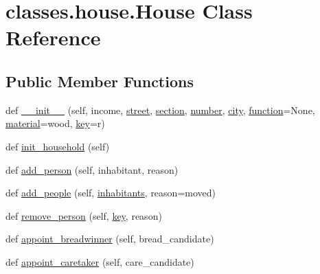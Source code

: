 \hypertarget{classclasses_1_1house_1_1House}{}\section{classes.\+house.\+House Class Reference}
\label{classclasses_1_1house_1_1House}
\subsection*{Public Member Functions}
\begin{DoxyCompactItemize}
\item 
def \hyperlink{classclasses_1_1house_1_1House_aff02285c20463b96120bd06ad62bf850}{\+\_\+\+\_\+init\+\_\+\+\_\+} (self, income, \hyperlink{classclasses_1_1house_1_1House_a73269c98a96b8b15efc85c1f8001af63}{street}, \hyperlink{classclasses_1_1house_1_1House_af840a6baf655e205bbf5aa4dfbc622ef}{section}, \hyperlink{classclasses_1_1house_1_1House_a8bcc1513617107cd48ebac9c51c49b35}{number}, \hyperlink{classclasses_1_1house_1_1House_a9be99bcd61afbb7df6cddef1aad45e86}{city}, \hyperlink{classclasses_1_1house_1_1House_aa8a07d4b06323f0f724c278602074c6a}{function}=None, \hyperlink{classclasses_1_1house_1_1House_a1b65cfb084c1d75d5ddf0b9c333db701}{material}=\textquotesingle{}wood\textquotesingle{}, \hyperlink{classclasses_1_1house_1_1House_a164bd96b26aad5ac106b447cf4b93cce}{key}=\textquotesingle{}r\textquotesingle{})
\item 
def \hyperlink{classclasses_1_1house_1_1House_a1e43e403c3fc9fc666f093431cd216d2}{init\+\_\+household} (self)
\item 
def \hyperlink{classclasses_1_1house_1_1House_a834356bf82f28e9e0c92738b0b9bccac}{add\+\_\+person} (self, inhabitant, reason)
\item 
def \hyperlink{classclasses_1_1house_1_1House_af11348c0a57c36f5ca2c923d8c1db348}{add\+\_\+people} (self, \hyperlink{classclasses_1_1house_1_1House_a577435fea023f4493335765065e4ff89}{inhabitants}, reason=\textquotesingle{}moved\textquotesingle{})
\item 
def \hyperlink{classclasses_1_1house_1_1House_ad72369c99790e0981182cc5d73e10aa4}{remove\+\_\+person} (self, \hyperlink{classclasses_1_1house_1_1House_a164bd96b26aad5ac106b447cf4b93cce}{key}, reason)
\item 
def \hyperlink{classclasses_1_1house_1_1House_ad448b07e7d817e96e3a7143c71862140}{appoint\+\_\+breadwinner} (self, bread\+\_\+candidate)
\item 
def \hyperlink{classclasses_1_1house_1_1House_a9b215f18d3a5138bcc474c67313654a1}{appoint\+\_\+caretaker} (self, care\+\_\+candidate)

\end{DoxyCompactItemize}

